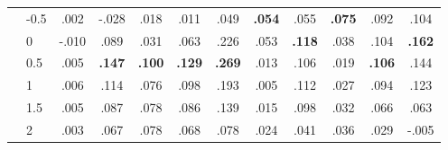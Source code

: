 \begin{table}[!htbp]
\begin{tabular*}{\textwidth}{@{\extracolsep{\fill}} llcccccccccc @{}}
 & -0.5 & .002 & -.028 & .018 & .011 & .049 & \textbf{.054} & .055 & \textbf{.075} & .092 & .104 \\
 & 0 & -.010 & .089 & .031 & .063 & .226 & .053 & \textbf{.118} & .038 & .104 & \textbf{.162} \\
 & 0.5 & .005 & \textbf{.147} & \textbf{.100} & \textbf{.129} & \textbf{.269} & .013 & .106 & .019 & \textbf{.106} & .144 \\
 & 1 & .006 & .114 & .076 & .098 & .193 & .005 & .112 & .027 & .094 & .123 \\
 & 1.5 & .005 & .087 & .078 & .086 & .139 & .015 & .098 & .032 & .066 & .063 \\
 & 2 & .003 & .067 & .078 & .068 & .078 & .024 & .041 & .036 & .029 & -.005 \\
\cline{1-12}
\bottomrule
\end{tabular*}
\end{table}